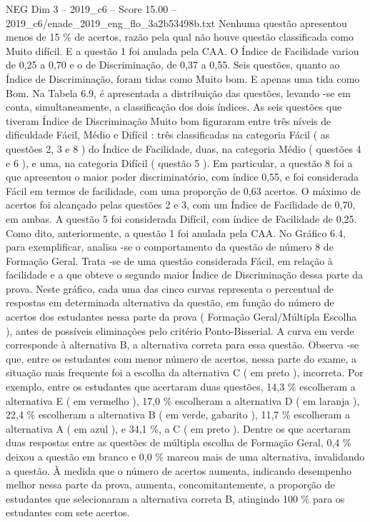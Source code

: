 \begin{textsample}{NEG Dim 3 – 2019\_c6 – Score 15.00 – 2019\_c6/enade\_2019\_eng\_flo\_3a2b53498b.txt}
Nenhuma questão apresentou menos de 15 \% de acertos, razão pela qual não houve questão classificada como Muito difícil.
E a questão 1 foi anulada pela CAA.
O Índice de Facilidade variou de 0,25 a 0,70 e o de Discriminação, de 0,37 a 0,55.
Seis questões, quanto ao Índice de Discriminação, foram tidas como Muito bom.
E apenas uma tida como Bom.
Na Tabela 6.9, é apresentada a distribuição das questões, levando -se em conta, simultaneamente, a classificação dos dois índices.
As seis questões que tiveram Índice de Discriminação Muito bom figuraram entre três níveis de dificuldade Fácil, Médio e Difícil : três classificadas na categoria Fácil ( as questões 2, 3 e 8 ) do Índice de Facilidade, duas, na categoria Médio ( questões 4 e 6 ), e uma, na categoria Difícil ( questão 5 ).
Em particular, a questão 8 foi a que apresentou o maior poder discriminatório, com índice 0,55, e foi considerada Fácil em termos de facilidade, com uma proporção de 0,63 acertos.
O máximo de acertos foi alcançado pelas questões 2 e 3, com um Índice de Facilidade de 0,70, em ambas.
A questão 5 foi considerada Difícil, com índice de Facilidade de 0,25.
Como dito, anteriormente, a questão 1 foi anulada pela CAA.
No Gráfico 6.4, para exemplificar, analisa -se o comportamento da questão de número 8 de Formação Geral.
Trata -se de uma questão considerada Fácil, em relação à facilidade e a que obteve o segundo maior Índice de Discriminação dessa parte da prova.
Neste gráfico, cada uma das cinco curvas representa o percentual de respostas em determinada alternativa da questão, em função do número de acertos dos estudantes nessa parte da prova ( Formação Geral/Múltipla Escolha ), antes de possíveis eliminações pelo critério Ponto-Bisserial.
A curva em verde corresponde à alternativa B, a alternativa correta para essa questão.
Observa -se que, entre os estudantes com menor número de acertos, nessa parte do exame, a situação mais frequente foi a escolha da alternativa C ( em preto ), incorreta.
Por exemplo, entre os estudantes que acertaram duas questões, 14,3 \% escolheram a alternativa E ( em vermelho ), 17,0 \% escolheram a alternativa D ( em laranja ), 22,4 \% escolheram a alternativa B ( em verde, gabarito ), 11,7 \% escolheram a alternativa A ( em azul ), e 34,1 \%, a C ( em preto ).
Dentre os que acertaram duas respostas entre as questões de múltipla escolha de Formação Geral, 0,4 \% deixou a questão em branco e 0,0 \% marcou mais de uma alternativa, invalidando a questão.
À medida que o número de acertos aumenta, indicando desempenho melhor nessa parte da prova, aumenta, concomitantemente, a proporção de estudantes que selecionaram a alternativa correta B, atingindo 100 \% para os estudantes com sete acertos.

\end{textsample}
